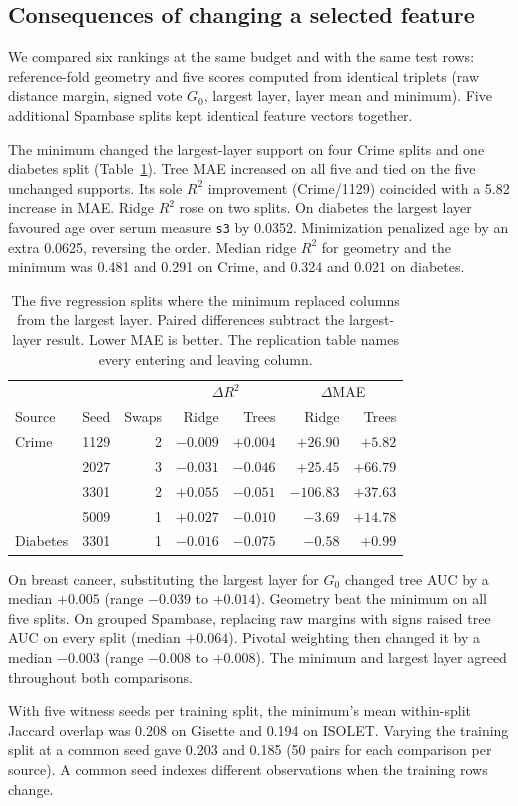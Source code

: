 \subsection{Consequences of changing a selected feature}
\label{sec:matched}
We compared six rankings at the same budget and with the same test rows: reference-fold geometry and five scores computed from identical triplets (raw distance margin, signed vote $G_0$, largest layer, layer mean and minimum). Five additional Spambase splits kept identical feature vectors together.

The minimum changed the largest-layer support on four Crime splits and one diabetes split (Table~\ref{tab:matched-reg}). Tree MAE increased on all five and tied on the five unchanged supports. Its sole $R^2$ improvement (Crime/1129) coincided with a 5.82 increase in MAE. Ridge $R^2$ rose on two splits. On diabetes the largest layer favoured age over serum measure \texttt{s3} by 0.0352. Minimization penalized age by an extra 0.0625, reversing the order. Median ridge $R^2$ for geometry and the minimum was 0.481 and 0.291 on Crime, and 0.324 and 0.021 on diabetes.

\begin{table}[tb]
\centering\small
\caption{The five regression splits where the minimum replaced columns from the largest layer. Paired differences subtract the largest-layer result. Lower MAE is better. The replication table names every entering and leaving column.}
\label{tab:matched-reg}
\begin{tabular}{@{}llrrrrr@{}}
\toprule
& & & \multicolumn{2}{c}{$\Delta R^2$} & \multicolumn{2}{c}{$\Delta$MAE}\\
Source & Seed & Swaps & Ridge & Trees & Ridge & Trees\\
\midrule
Crime & 1129 & 2 & $-0.009$ & $+0.004$ & $+26.90$ & $+5.82$\\
      & 2027 & 3 & $-0.031$ & $-0.046$ & $+25.45$ & $+66.79$\\
      & 3301 & 2 & $+0.055$ & $-0.051$ & $-106.83$ & $+37.63$\\
      & 5009 & 1 & $+0.027$ & $-0.010$ & $-3.69$ & $+14.78$\\
Diabetes & 3301 & 1 & $-0.016$ & $-0.075$ & $-0.58$ & $+0.99$\\
\bottomrule
\end{tabular}
\end{table}

On breast cancer, substituting the largest layer for $G_0$ changed tree AUC by a median $+0.005$ (range $-0.039$ to $+0.014$). Geometry beat the minimum on all five splits. On grouped Spambase, replacing raw margins with signs raised tree AUC on every split (median $+0.064$). Pivotal weighting then changed it by a median $-0.003$ (range $-0.008$ to $+0.008$). The minimum and largest layer agreed throughout both comparisons.

With five witness seeds per training split, the minimum's mean within-split Jaccard overlap was 0.208 on Gisette and 0.194 on ISOLET. Varying the training split at a common seed gave 0.203 and 0.185 (50 pairs for each comparison per source). A common seed indexes different observations when the training rows change.
